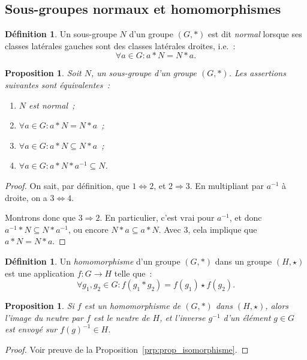 \documentclass{article}
\newtheorem{prp}[thm]{Proposition}
\theoremstyle{definition}
\newtheorem{déf}[thm]{Définition}
\theoremstyle{remark}
\begin{document}
	\subsection{Sous-groupes normaux et homomorphismes}
		\begin{déf} Un sous-groupe $N$ d'un groupe $(G, *)$ est dit \textit{normal} lorsque ses classes latérales gauches sont des classes latérales droites, i.e.~:
		\[\forall a \in G : a*N = N*a.\]
		\end{déf}

		\begin{prp} Soit $N$, un sous-groupe d'un groupe $(G, *)$. Les assertions suivantes sont équivalentes~:
		\begin{enumerate}
			\item $N$ est normal~;
			\item $\forall a \in G : a*N = N*a$~;
			\item $\forall a \in G : a*N \subseteq N*a$~;
			\item $\forall a \in G : a*N*a^{-1} \subseteq N$.
		\end{enumerate}
		\end{prp}

		\begin{proof} On sait, par définition, que $1 \iff 2$, et $2 \Rightarrow 3$. En multipliant par $a^{-1}$ à droite, on a $3 \iff 4$.

		Montrons donc que $3 \Rightarrow 2$. En particulier, c'est vrai pour $a^{-1}$, et donc $a^{-1}*N \subseteq N*a^{-1}$, ou encore $N*a \subseteq a*N$.
		Avec $3$, cela implique que $a*N = N*a$.
		\end{proof}

		\begin{déf} Un \textit{homomorphisme} d'un groupe $(G, *)$ dans un groupe $(H, \star)$ est une application $f : G \to H$ telle que~:
		\[\forall g_1, g_2 \in G : f(g_1 * g_2) = f(g_1) \star f(g_2).\]
		\end{déf}

		\begin{prp} Si $f$ est un homomorphisme de $(G, *)$ dans $(H, \star)$, alors l'image du neutre par $f$ est le neutre de $H$, et l'inverse $g^{-1}$ d'un
		élément $g \in G$ est envoyé sur $f(g)^{-1} \in H$.
		\end{prp}

		\begin{proof} Voir preuve de la Proposition~\ref{prp:prop_isomorphisme}.
		\end{proof}
\end{document}
